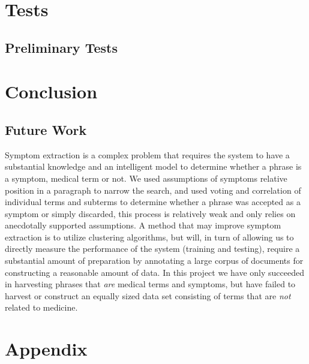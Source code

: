 \documentclass[10pt,letterpaper,draft]{article}
\begin{document}


\section{Tests}

\subsection{Preliminary Tests}


\section{Conclusion}

\subsection{Future Work}
Symptom extraction is a complex problem that requires the system to have
a substantial knowledge and an intelligent model to determine whether a
phrase is a symptom, medical term or not. We used assumptions of
symptoms relative position in a paragraph to narrow the search, and used
voting and correlation of individual terms and subterms to determine
whether a phrase was accepted as a symptom or simply discarded, this
process is relatively weak and only relies on anecdotally supported
assumptions.
A method that may improve symptom extraction is to utilize clustering
algorithms, but will, in turn of allowing us to directly measure the
performance of the system (training and testing), require a substantial
amount of preparation by annotating a large corpus of documents for
constructing a reasonable amount of data. In this project we have only
succeeded in harvesting phrases that \textit{are} medical terms and
symptoms, but have failed to harvest or construct an equally sized data
set consisting of terms that are \textit{not} related to medicine.




\appendix
\section{Appendix}
\label{app:orphanet}

\renewcommand\bibname{References}


\end{document}
